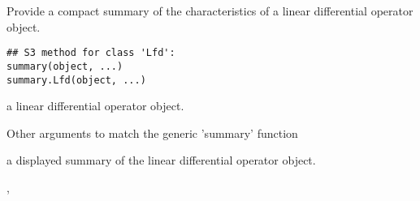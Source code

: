 \documentclass{article}
\begin{document}
\begin{Description}\relax
Provide a compact summary of the characteristics of a
linear differential operator object.
\end{Description}
\begin{Usage}
\begin{verbatim}
## S3 method for class 'Lfd':
summary(object, ...)
summary.Lfd(object, ...)
\end{verbatim}
\end{Usage}
\begin{Arguments}
\begin{ldescription}
\item[\code{object}] a linear differential operator object.

\item[\code{...}] Other arguments to match the generic 'summary' function
\end{ldescription}
\end{Arguments}
\begin{Value}
a displayed summary of the linear differential operator object.
\end{Value}
\begin{SeeAlso}\relax
{},
\end{SeeAlso}
\end{document}
